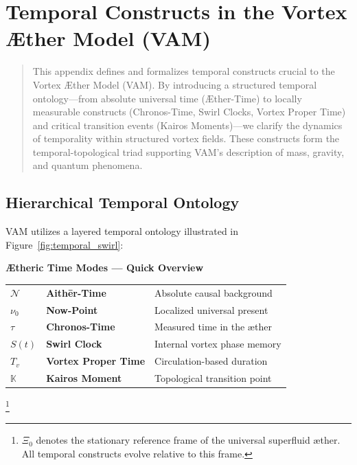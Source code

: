 \section{Temporal Constructs in the Vortex Æther Model (VAM)}

\begin{abstract}
This appendix defines and formalizes temporal constructs crucial to the Vortex Æther Model (VAM). By introducing a structured temporal ontology—from absolute universal time (Æther-Time) to locally measurable constructs (Chronos-Time, Swirl Clocks, Vortex Proper Time) and critical transition events (Kairos Moments)—we clarify the dynamics of temporality within structured vortex fields. These constructs form the temporal-topological triad supporting VAM's description of mass, gravity, and quantum phenomena.
\end{abstract}

\subsection{Hierarchical Temporal Ontology}

VAM utilizes a layered temporal ontology illustrated in Figure~\ref{fig:temporal_swirl}:
\begin{center}
    \begin{tcolorbox}[colback=gray!10, colframe=black, width=0.9\textwidth, sharp corners=southwest, boxrule=0.5pt]
        \textbf{Ætheric Time Modes — Quick Overview}
        \vspace{0.5em}

        \begin{tabular}{@{}p{1.5cm}p{5.2cm}p{6cm}@{}}
            \(\mathcal{N}\)     & \textbf{Aithēr-Time}         & Absolute causal background \\
            \(\nu_0\)           & \textbf{Now-Point}           & Localized universal present \\
            \(\tau\)            & \textbf{Chronos-Time}        & Measured time in the æther \\
            \(S(t)\)            & \textbf{Swirl Clock}         & Internal vortex phase memory \\
            \(T_v\)             & \textbf{Vortex Proper Time}  & Circulation-based duration \\
            \(\mathbb{K}\)      & \textbf{Kairos Moment}       & Topological transition point \\
        \end{tabular}
    \end{tcolorbox}
\end{center}
\footnote{\(\Xi_0\) denotes the stationary reference frame of the universal superfluid æther. All temporal constructs evolve relative to this frame.}


